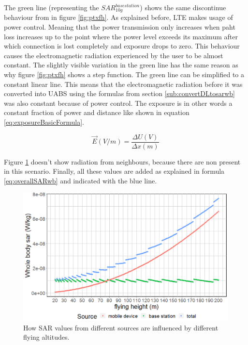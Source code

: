 The green line (representing the $SAR^{basestation}_{10g}$) shows the same discontinue 
behaviour from in figure \ref{fig:ptxfh}. As explained before, \gls{LTE} makes usage of power control. Meaning that the power transmission only increases when paht loss 
increases up to the point where the power level exceeds its maximum after which connection is lost completely and exposure drops to zero. 
This behaviour causes the electromagnetic radiation experienced by the user to be almost constant. The slightly visible variation in the green line
has the same reason as why figure \ref{fig:ptxfh} shows a step function. The green line can be simplified to a constant linear line.
This means that 
the electromagnetic radiation before it was converted into  \gls{UABS} using the formulas from section \ref{sub:convertDLtosarwb} was 
also constant because of power control.
 The exposure is in other words a constant fraction of power and distance like shown in equation \ref{eq:exposureBasicFormula}.

\begin{equation}
\vec{E} (V/m) = \frac{\Delta U (V) }{\Delta x (m)}
\label{eq:exposureBasicFormula}
\end{equation}

Figure \ref{fig:s1_fhsar} doesn't show radiation from neighbours, because there are non present in this scenario. Finally, all these values are added as explained in formula
\ref{eq:overallSARwb} and indicated with the blue line. 
\begin{figure}[th!]
  \includegraphics[width=\textwidth]{../results/s1/fhvssar2.png}
  \caption{How SAR values from different sources are influenced by different flying altitudes.}
  \label{fig:s1_fhsar}
\end{figure}


